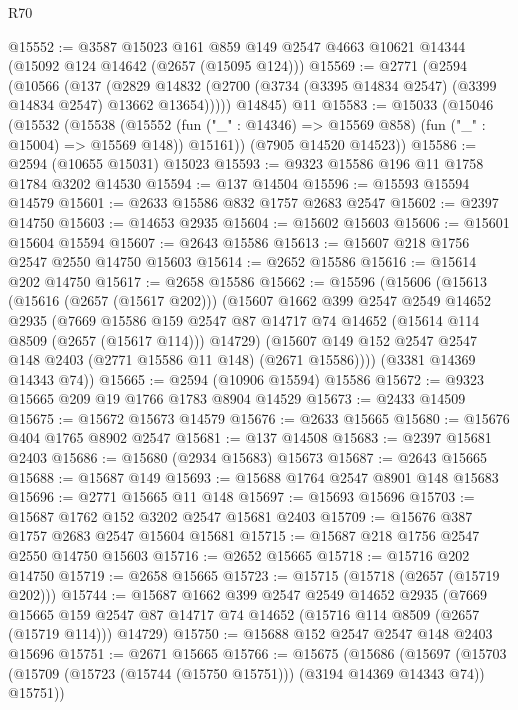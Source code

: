 \begin{lexlean}{R70}
\begin{coremodule}
@15552 := @3587
    @15023
    @161
    @859
    @149
    @2547
    @4663
    @10621
    @14344
    (@15092 @124 @14642 (@2657 (@15095 @124)))
@15569 := @2771
    (@2594
      (@10566
        (@137
          (@2829 @14832 (@2700 (@3734 (@3395 @14834 @2547) (@3399 @14834 @2547) @13662 @13654)))))
      @14845)
    @11
@15583 := @15033
    (@15046
      (@15532
        (@15538
          (@15552 (fun ("_" : @14346) => @15569 @858) (fun ("_" : @15004) => @15569 @148))
          @15161))
      (@7905 @14520 @14523))
@15586 := @2594 (@10655 @15031) @15023
@15593 := @9323 @15586 @196 @11 @1758 @1784 @3202 @14530
@15594 := @137 @14504
@15596 := @15593 @15594 @14579
@15601 := @2633 @15586 @832 @1757 @2683 @2547
@15602 := @2397 @14750
@15603 := @14653 @2935
@15604 := @15602 @15603
@15606 := @15601 @15604 @15594
@15607 := @2643 @15586
@15613 := @15607 @218 @1756 @2547 @2550 @14750 @15603
@15614 := @2652 @15586
@15616 := @15614 @202 @14750
@15617 := @2658 @15586
@15662 := @15596
    (@15606
      (@15613
        (@15616 (@2657 (@15617 @202)))
        (@15607
          @1662
          @399
          @2547
          @2549
          @14652
          @2935
          (@7669
            @15586
            @159
            @2547
            @87
            @14717
            @74
            @14652
            (@15614 @114 @8509 (@2657 (@15617 @114)))
            @14729)
          (@15607 @149 @152 @2547 @2547 @148 @2403 (@2771 @15586 @11 @148) (@2671 @15586))))
      (@3381 @14369 @14343 @74))
@15665 := @2594 (@10906 @15594) @15586
@15672 := @9323 @15665 @209 @19 @1766 @1783 @8904 @14529
@15673 := @2433 @14509
@15675 := @15672 @15673 @14579
@15676 := @2633 @15665
@15680 := @15676 @404 @1765 @8902 @2547
@15681 := @137 @14508
@15683 := @2397 @15681 @2403
@15686 := @15680 (@2934 @15683) @15673
@15687 := @2643 @15665
@15688 := @15687 @149
@15693 := @15688 @1764 @2547 @8901 @148 @15683
@15696 := @2771 @15665 @11 @148
@15697 := @15693 @15696
@15703 := @15687 @1762 @152 @3202 @2547 @15681 @2403
@15709 := @15676 @387 @1757 @2683 @2547 @15604 @15681
@15715 := @15687 @218 @1756 @2547 @2550 @14750 @15603
@15716 := @2652 @15665
@15718 := @15716 @202 @14750
@15719 := @2658 @15665
@15723 := @15715 (@15718 (@2657 (@15719 @202)))
@15744 := @15687
    @1662
    @399
    @2547
    @2549
    @14652
    @2935
    (@7669 @15665 @159 @2547 @87 @14717 @74 @14652 (@15716 @114 @8509 (@2657 (@15719 @114))) @14729)
@15750 := @15688 @152 @2547 @2547 @148 @2403 @15696
@15751 := @2671 @15665
@15766 := @15675
    (@15686
      (@15697 (@15703 (@15709 (@15723 (@15744 (@15750 @15751))) (@3194 @14369 @14343 @74)) @15751))

\end{coremodule}
\end{lexlean}
